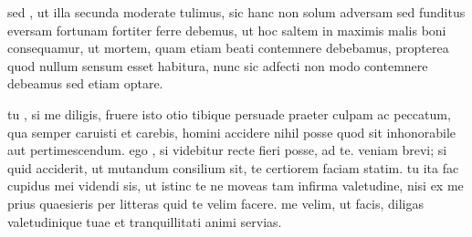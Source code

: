  sed , ut illa secunda moderate tulimus, sic hanc non solum adversam sed funditus eversam fortunam fortiter ferre debemus, ut hoc saltem in maximis malis boni consequamur, ut mortem, quam etiam beati contemnere debebamus, propterea quod nullum sensum esset habitura, nunc sic adfecti non modo contemnere debeamus sed etiam optare.

 tu , si me diligis, fruere isto otio tibique persuade praeter culpam ac peccatum, qua semper caruisti et carebis, homini accidere nihil posse quod sit inhonorabile aut pertimescendum. ego , si videbitur recte fieri posse, ad te. veniam brevi; si quid acciderit, ut mutandum consilium sit, te certiorem faciam statim. tu ita fac cupidus mei videndi sis, ut istinc te ne moveas tam infirma valetudine, nisi ex me prius quaesieris per litteras quid te velim facere. me velim, ut facis, diligas valetudinique tuae et tranquillitati animi servias.
